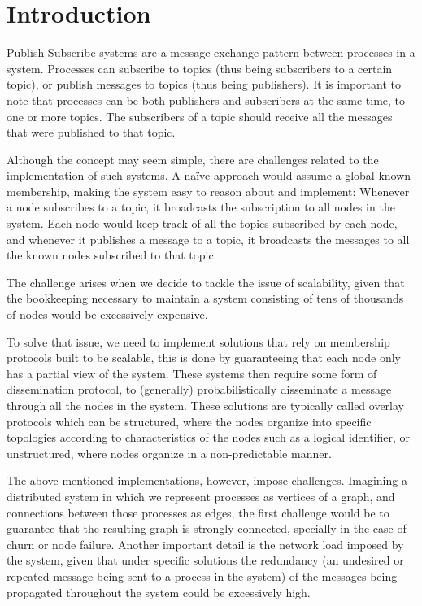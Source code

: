 \documentclass[sigconf]{acmart}
\begin{document}
\section{Introduction}

Publish-Subscribe systems are a message exchange pattern between processes in a system. Processes can subscribe to topics (thus being subscribers to a certain topic), or publish messages to topics (thus being publishers). It is important to note that processes can be both publishers and subscribers at the same time, to one or more topics. The subscribers of a topic should receive all the messages that were published to that topic.

Although the concept may seem simple, there are challenges related to the implementation of such systems. A naïve approach would assume a global known membership, making the system easy to reason about and implement:
Whenever a node subscribes to a topic, it broadcasts the subscription to all nodes in the system. Each node would keep track of all the topics subscribed by each node, and whenever it publishes a message to a topic, it broadcasts the messages to all the known nodes subscribed to that topic.

The challenge arises when we decide to tackle the issue of scalability, given that the bookkeeping necessary to maintain a system consisting of tens of thousands of nodes would be excessively expensive.

To solve that issue, we need to implement solutions that rely on membership protocols built to be scalable, this is done by guaranteeing that each node only has a partial view of the system. These systems then require some form of dissemination protocol, to (generally) probabilistically disseminate a message through all the nodes in the system.
These solutions are typically called overlay protocols which can be structured, where the nodes organize into specific topologies according to characteristics of the nodes such as a logical identifier, or unstructured, where nodes organize in a non-predictable manner.

The above-mentioned implementations, however, impose challenges. Imagining a distributed system in which we represent processes as vertices of a graph, and connections between those processes as edges, the first challenge would be to guarantee that the resulting graph is strongly connected, specially in the case of churn or node failure. Another important detail is the network load imposed by the system, given that under specific solutions the redundancy (an undesired or repeated message being sent to a process in the system) of the messages being propagated throughout the system could be excessively high.
\end{document}
